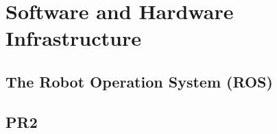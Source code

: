 \chapter{Software and Hardware Infrastructure}
\label{chapter:SHI}

\section{The Robot Operation System (ROS)}
\label{sec:ros}

\section{PR2}
\label{sec:pr2}



